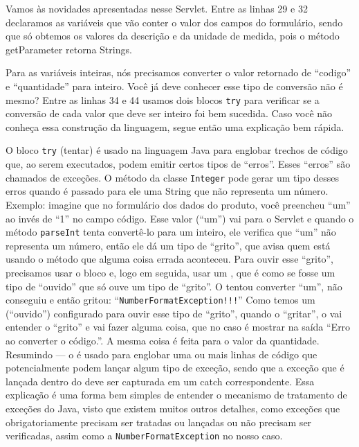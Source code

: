 
Vamos às novidades apresentadas nesse Servlet. Entre as linhas 29 e 32 declaramos as variáveis que vão conter o valor dos campos do formulário, sendo que só obtemos os valores da descrição e da unidade de medida, pois o método getParameter retorna Strings.

Para as variáveis inteiras, nós precisamos converter o valor retornado de ``codigo'' e ``quantidade'' para inteiro. Você já deve conhecer esse tipo de conversão não é mesmo? Entre as linhas 34 e 44 usamos dois blocos \texttt{try} para verificar se a conversão de cada valor que deve ser inteiro foi bem sucedida. Caso você não conheça essa construção da linguagem, segue então uma explicação bem rápida.

O bloco \texttt{try} (tentar) é usado na linguagem Java para englobar trechos de código que, ao serem executados, podem emitir certos tipos de ``erros''. Esses ``erros'' são chamados de exceções. O método  da classe \texttt{Integer} pode gerar um tipo desses erros quando é passado para ele uma String que não representa um número. Exemplo: imagine que no formulário dos dados do produto, você preencheu ``um'' ao invés de ``1'' no campo código. Esse valor (``um'') vai para o Servlet e quando o método \texttt{parseInt} tenta convertê-lo para um inteiro, ele verifica que ``um'' não representa um número, então ele dá um tipo de ``grito'', que avisa quem está usando o método que alguma coisa errada aconteceu. Para ouvir esse ``grito'', precisamos usar o bloco  e, logo em seguida, usar um , que é como se fosse um tipo de ``ouvido'' que só ouve um tipo de ``grito''. O  tentou converter ``um'', não conseguiu e então gritou: ``\texttt{NumberFormatException!!!}'' Como temos um  (``ouvido'') configurado para ouvir esse tipo de ``grito'', quando o  ``gritar'', o  vai entender o ``grito'' e vai fazer alguma coisa, que no caso é mostrar na saída ``Erro ao converter o código.''. A mesma coisa é feita para o valor da quantidade. Resumindo --- o  é usado para englobar uma ou mais linhas de código que potencialmente podem lançar algum tipo de exceção, sendo que a exceção que é lançada dentro do  deve ser capturada em um catch correspondente. Essa explicação é uma forma bem simples de entender o mecanismo de tratamento de exceções do Java, visto que existem muitos outros detalhes, como exceções que obrigatoriamente precisam ser tratadas ou lançadas ou não precisam ser verificadas, assim como a \texttt{NumberFormatException} no nosso caso.

